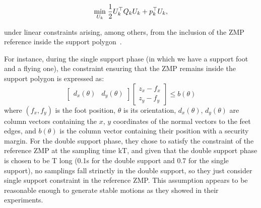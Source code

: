 \begin{equation}
 \underset{U_k}{\min} \; \dfrac{1}{2} U_k^{\top} Q_k U_k + p_k^{\top} U_k,
\label{Eq:QP}
\end{equation}

under linear constraints arising, among others, from the inclusion of the ZMP reference inside the support polygon~\citep{HerdtAR2010}.

For instance, during the single support phase (in which we have a support foot and a flying one), the constraint ensuring that the ZMP remains inside the support polygon is expressed as:
\begin{equation}
  \begin{bmatrix} d_x(\theta) & d_y(\theta) \end{bmatrix}
  \begin{bmatrix} z_x - f_x \\ z_y - f_y \end{bmatrix} \leq b(\theta)
\end{equation}
where $(f_x,f_y)$ is the foot position, $\theta$ is its orientation,
$d_x(\theta)$, $d_y(\theta)$ are column vectors containing the $x$,
$y$ coordinates of the normal vectors to the feet edges, and $b(\theta)$  is the column vector containing their position with a security margin. For the double support phase, they chose to satisfy the constraint of the reference ZMP at the sampling time kT, and given that the double support phase is chosen to be T long (0.1s for the double support and 0.7 for the single support), no samplings fall strinctly in the double support, so they just consider single support constraint in the reference ZMP. This assumption appears to be reasonable enough to generate stable motions as they showed in their experiments.